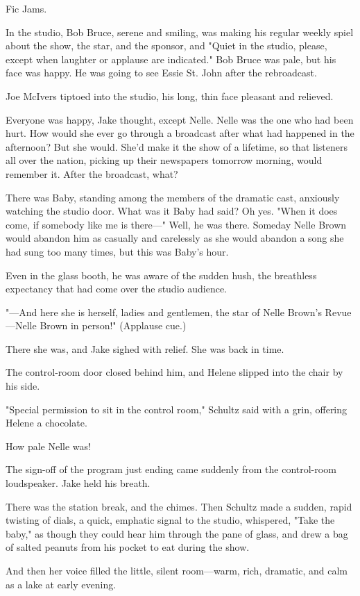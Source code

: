 \documentclass{novel}
\begin{document}
Fic Jams.

In the studio, Bob Bruce, serene and smiling, was making his regular weekly spiel about the show, the star, and the sponsor, and "Quiet in the studio, please, except when laughter or applause are indicated." Bob Bruce was pale, but his face was happy. He was going to see Essie St. John after the rebroadcast.

Joe McIvers tiptoed into the studio, his long, thin face pleasant and relieved.

Everyone was happy, Jake thought, except Nelle. Nelle was the one who had been hurt. How would she ever go through a broadcast after what had happened in the afternoon? But she would. She'd make it the show of a lifetime, so that listeners all over the nation, picking up their newspapers tomorrow morning, would remember it. After the broadcast, what?

There was Baby, standing among the members of the dramatic cast, anxiously watching the studio door. What was it Baby had said? Oh yes. "When it does come, if somebody like me is there—" Well, he was there. Someday Nelle Brown would abandon him as casually and carelessly as she would abandon a song she had sung too many times, but this was Baby's hour.

Even in the glass booth, he was aware of the sudden hush, the breathless expectancy that had come over the studio audience.

"—And here she is herself, ladies and gentlemen, the star of Nelle Brown's Revue—Nelle Brown in person!" (Applause cue.)

There she was, and Jake sighed with relief. She was back in time.

The control-room door closed behind him, and Helene slipped into the chair by his side.

"Special permission to sit in the control room," Schultz said with a grin, offering Helene a chocolate.

How pale Nelle was!

The sign-off of the program just ending came suddenly from the control-room loudspeaker. Jake held his breath.

There was the station break, and the chimes. Then Schultz made a sudden, rapid twisting of dials, a quick, emphatic signal to the studio, whispered, "Take the baby," as though they could hear him through the pane of glass, and drew a bag of salted peanuts from his pocket to eat during the show.

And then her voice filled the little, silent room—warm, rich, dramatic, and calm as a lake at early evening.
\end{document}
